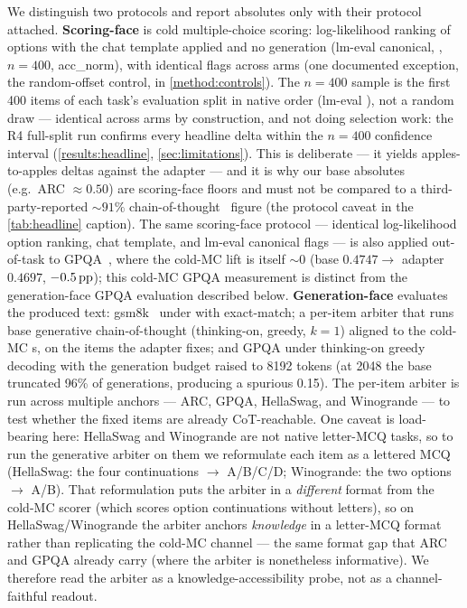 We distinguish two protocols and report absolutes only with their protocol attached.
\textbf{Scoring-face} is cold multiple-choice scoring: log-likelihood ranking of
options with the chat template applied and no generation (lm-eval canonical,
, $n{=}400$, acc\_norm), with identical flags across
arms (one documented exception, the random-offset control, in
\cref{method:controls}). The $n{=}400$ sample is the first 400 items of each task's evaluation split in
native order (lm-eval ), not a random draw --- identical across
arms by construction, and not doing selection work: the R4 full-split run confirms
every headline delta within the $n{=}400$ confidence interval
(\cref{results:headline}, \cref{sec:limitations}). This is deliberate --- it yields
apples-to-apples deltas against the adapter --- and it is why our base absolutes
(e.g.\ ARC ${\approx}0.50$) are scoring-face floors and must not be compared to a
third-party-reported ${\sim}91\%$ chain-of-thought~\citep{ChainOfThought} figure (the protocol caveat in
the \cref{tab:headline} caption). The same scoring-face protocol --- identical
log-likelihood option ranking, chat template, and lm-eval canonical flags --- is
also applied out-of-task to GPQA~\citep{GPQA}, where the cold-MC lift is itself ${\sim}0$ (base
$0.4747 \rightarrow$ adapter $0.4697$, $-0.5\,\mathrm{pp}$); this cold-MC GPQA measurement is
distinct from the generation-face GPQA evaluation described below.
\textbf{Generation-face} evaluates the produced text: gsm8k~\citep{GSM8K} under
 with exact-match; a per-item arbiter that runs base
generative chain-of-thought (thinking-on, greedy, $k{=}1$) aligned to the cold-MC
s, on the items the adapter fixes; and GPQA under thinking-on greedy
decoding with the generation budget raised to 8192 tokens (at 2048 the base
truncated 96\% of generations, producing a spurious 0.15). The per-item arbiter is
run across multiple anchors --- ARC, GPQA, HellaSwag, and Winogrande --- to test
whether the fixed items are already CoT-reachable. One caveat is load-bearing here:
HellaSwag and Winogrande are not native letter-MCQ tasks, so to run the generative
arbiter on them we reformulate each item as a lettered MCQ (HellaSwag: the four
continuations $\rightarrow$ A/B/C/D; Winogrande: the two options $\rightarrow$ A/B).
That reformulation puts the arbiter in a \emph{different} format from the cold-MC
scorer (which scores option continuations without letters), so on
HellaSwag/Winogrande the arbiter anchors \emph{knowledge} in a letter-MCQ format
rather than replicating the cold-MC channel --- the same format gap that ARC and
GPQA already carry (where the arbiter is nonetheless informative). We therefore read
the arbiter as a knowledge-accessibility probe, not as a channel-faithful readout.

